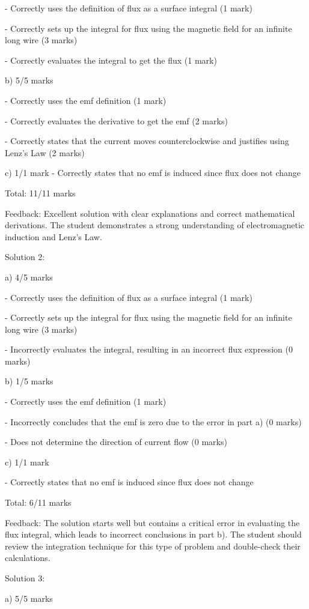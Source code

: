 \documentclass[a4paper,11pt]{article}
\begin{document}
- Correctly uses the definition of flux as a surface integral (1 mark)

- Correctly sets up the integral for flux using the magnetic field for an infinite long wire (3 marks)

- Correctly evaluates the integral to get the flux (1 mark)

b) 5/5 marks

- Correctly uses the emf definition (1 mark)

- Correctly evaluates the derivative to get the emf (2 marks)

- Correctly states that the current moves counterclockwise and justifies using Lenz's Law (2 marks)

c) 1/1 mark
- Correctly states that no emf is induced since flux does not change

Total: 11/11 marks

Feedback: Excellent solution with clear explanations and correct mathematical derivations. The student demonstrates a strong understanding of electromagnetic induction and Lenz's Law.

Solution 2:

a) 4/5 marks

- Correctly uses the definition of flux as a surface integral (1 mark)

- Correctly sets up the integral for flux using the magnetic field for an infinite long wire (3 marks)

- Incorrectly evaluates the integral, resulting in an incorrect flux expression (0 marks)

b) 1/5 marks

- Correctly uses the emf definition (1 mark)

- Incorrectly concludes that the emf is zero due to the error in part a) (0 marks)

- Does not determine the direction of current flow (0 marks)

c) 1/1 mark

- Correctly states that no emf is induced since flux does not change

Total: 6/11 marks

Feedback: The solution starts well but contains a critical error in evaluating the flux integral, which leads to incorrect conclusions in part b). The student should review the integration technique for this type of problem and double-check their calculations.

Solution 3:

a) 5/5 marks
\end{document}
